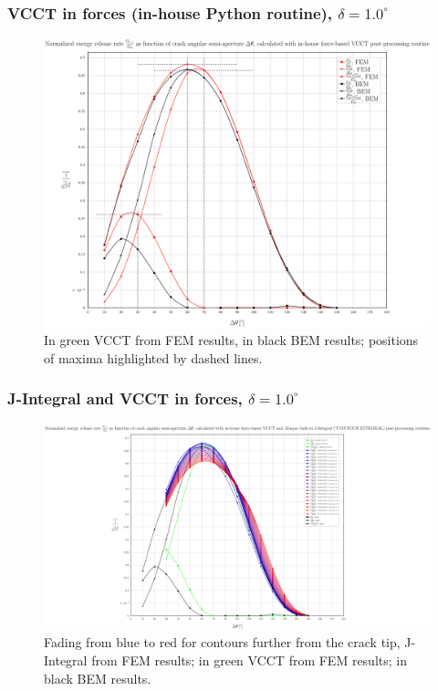 \documentclass[first,firstsupp,lastsupp,handout,last,hyperref,table]{ETHclass}
\begin{document}
\begin{frame}
\frametitle{\small VCCT in forces (in-house Python routine), $\delta=1.0^{\circ}$}
\vspace{-0.5cm}
\centering
\captionsetup[figure]{font=scriptsize,labelfont=scriptsize}
\begin{figure}[!h]
\centering
\includegraphics[height=0.7\textheight]{2017-07-10_AbqRunSummary_SmallStrainD10_M-F-VCCT_Summary.pdf}
  \caption{\scriptsize In green VCCT from FEM results, in black BEM results; positions of maxima highlighted by dashed lines.}
  \label{fig:res1}
\end{figure}
\end{frame}

\begin{frame}
\frametitle{\small J-Integral and VCCT in forces, $\delta=1.0^{\circ}$}
\vspace{-0.5cm}
\centering
\captionsetup[figure]{font=scriptsize,labelfont=scriptsize}
\begin{figure}[!h]
\centering
\includegraphics[height=0.7\textheight]{2017-07-10_AbqRunSummary_SmallStrainD10_F-VCCT-JINT_Summary.pdf}
  \caption{\scriptsize Fading from blue to red for contours further from the crack tip, J-Integral from FEM results; in green VCCT from FEM results; in black BEM results.}
  \label{fig:res1}
\end{figure}
\end{frame}
\end{document}
